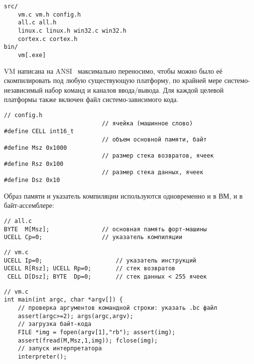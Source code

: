 \clearpage
{}\label{vm}\secdown

\begin{verbatim}
src/
    vm.c vm.h config.h
    all.c all.h
    linux.c linux.h win32.c win32.h
    cortex.c cortex.h
bin/
    vm[.exe]
\end{verbatim}

\noindent
VM написана на ANSI \ci\ максимально переносимо, чтобы можно было её
скомпилировать под любую существующую платформу, по крайней мере
системо-независимый набор команд и каналов ввода/вывода. Для каждой целевой
платформы также включен файл системо-зависимого кода.

\clearpage
\begin{verbatim}// config.h
                            // ячейка (машинное слово)
#define CELL int16_t
                            // объем основной памяти, байт
#define Msz 0x1000
                            // размер стека возвратов, ячеек
#define Rsz 0x100
                            // размер стека данных, ячеек
#define Dsz 0x10
\end{verbatim}

\noindent
Образ памяти и указатель компиляции используются одновременно и в ВМ, и в
байт-ассемблере:

\begin{verbatim}// all.c
BYTE  M[Msz];               // основная память форт-машины
UCELL Cp=0;                 // указатель компиляции
\end{verbatim}

\clearpage
\begin{verbatim}// vm.c
UCELL Ip=0;                     // указатель инструкций
UCELL R[Rsz]; UCELL Rp=0;       // стек возвратов
 CELL D[Dsz]; BYTE  Dp=0;       // стек данных < 255 ячеек
\end{verbatim}

\begin{verbatim}// vm.c
int main(int argc, char *argv[]) {
    // проверка аргументов командной строки: указать .bc файл
    assert(argc>=2); args(argc,argv);
    // загрузка байт-кода
    FILE *img = fopen(argv[1],"rb"); assert(img);
    assert(fread(M,Msz,1,img)); fclose(img);
    // запуск интерпретатора
    interpreter();
\end{verbatim}

\secup

